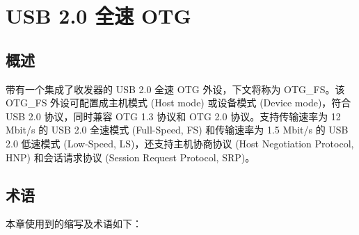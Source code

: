 \documentclass[main\_\_CN.tex]{subfiles}
\begin{document}

\ifglobal
\else
    \listoftodos
    {\let\clearpage\relax \listofdonetodos}
    \tableofcontents
\fi



\hypertarget{usbotgfs}{}
\chapter{USB 2.0 全速 OTG}
\label{mod:usbotgfs}

\section{概述}
\chipname{} 带有一个集成了收发器的 USB 2.0 全速 OTG 外设，下文将称为 OTG\_FS。该 OTG\_FS 外设可配置成主机模式 (Host mode) 或设备模式 (Device mode)，符合 USB 2.0 协议，同时兼容 OTG 1.3 协议和 OTG 2.0 协议。支持传输速率为 12 Mbit/s 的 USB 2.0 全速模式 (Full-Speed, FS) 和传输速率为 1.5 Mbit/s 的 USB 2.0 低速模式 (Low-Speed, LS)，还支持主机协商协议 (Host Negotiation Protocol, HNP) 和会话请求协议 (Session Request Protocol, SRP)。

\section{术语}

本章使用到的缩写及术语如下：
\end{document}
